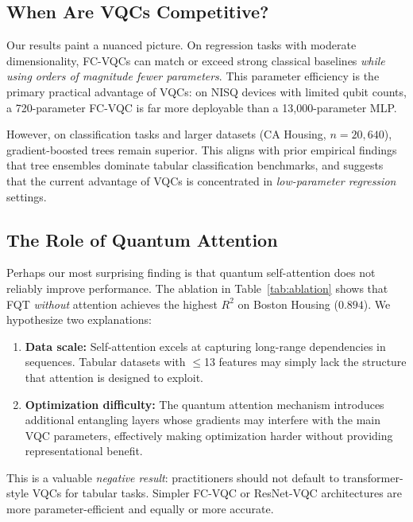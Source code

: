 
\subsection{When Are VQCs Competitive?}

Our results paint a nuanced picture.  On regression tasks with moderate
dimensionality, FC-VQCs can match or exceed strong classical baselines
\emph{while using orders of magnitude fewer parameters}.  This parameter
efficiency is the primary practical advantage of VQCs: on NISQ devices with
limited qubit counts, a 720-parameter FC-VQC is far more deployable than a
13{,}000-parameter MLP.

However, on classification tasks and larger datasets (CA Housing, $n{=}20{,}640$),
gradient-boosted trees remain superior.  This aligns with prior empirical
findings that tree ensembles dominate tabular classification benchmarks, and
suggests that the current advantage of VQCs is concentrated in
\emph{low-parameter regression} settings.

\subsection{The Role of Quantum Attention}

Perhaps our most surprising finding is that quantum self-attention does not
reliably improve performance.  The ablation in Table~\ref{tab:ablation}
shows that FQT \emph{without} attention achieves the highest $R^2$ on Boston
Housing ($0.894$).  We hypothesize two explanations:

\begin{enumerate}
  \item \textbf{Data scale:} Self-attention excels at capturing long-range
    dependencies in sequences.  Tabular datasets with ${\leq}$13 features
    may simply lack the structure that attention is designed to exploit.
  \item \textbf{Optimization difficulty:} The quantum attention mechanism
    introduces additional entangling layers whose gradients may interfere
    with the main VQC parameters, effectively making optimization harder
    without providing representational benefit.
\end{enumerate}

This is a valuable \emph{negative result}: practitioners should not default
to transformer-style VQCs for tabular tasks.  Simpler FC-VQC or ResNet-VQC
architectures are more parameter-efficient and equally or more accurate.

